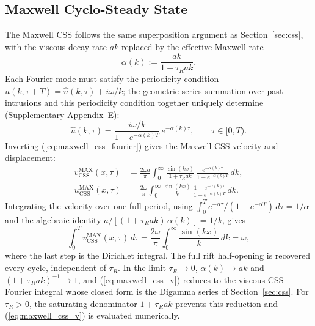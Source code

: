 \documentclass[12pt]{article}
\begin{document}
\subsection{Maxwell Cyclo-Steady State}
\label{sec:maxwell_css}

The Maxwell CSS follows the same superposition argument as
Section~\ref{sec:css}, with the viscous decay rate $ak$ replaced by the
effective Maxwell rate
\begin{equation}
  \alpha(k) := \frac{ak}{1+\tau_R ak}.
  \label{eq:alpha_k}
\end{equation}
Each Fourier mode must satisfy the periodicity condition
$\hat{u}(k,\tau+T) = \hat{u}(k,\tau) + i\omega/k$; the geometric-series
summation over past intrusions and this periodicity condition together
uniquely determine (Supplementary Appendix~E):
\begin{equation}
  \hat{u}(k,\tau) = \frac{i\omega/k}{1-e^{-\alpha(k)T}}\,e^{-\alpha(k)\tau},
  \qquad \tau\in[0,T).
  \label{eq:maxwell_css_fourier}
\end{equation}
Inverting (\ref{eq:maxwell_css_fourier}) gives the Maxwell CSS velocity
and displacement:
\begin{align}
  v_{\text{CSS}}^{\text{MAX}}(x,\tau)
  &= \frac{2\omega a}{\pi}\int_0^{\infty}
     \frac{\sin(kx)}{1+\tau_R ak}\,
     \frac{e^{-\alpha(k)\tau}}{1-e^{-\alpha(k)T}}\,dk,
  \label{eq:maxwell_css_v} \\
  u_{\text{CSS}}^{\text{MAX}}(x,\tau)
  &= \frac{2\omega}{\pi}\int_0^{\infty}
     \frac{\sin(kx)}{k}\,
     \frac{1-e^{-\alpha(k)\tau}}{1-e^{-\alpha(k)T}}\,dk.
  \label{eq:maxwell_css_u}
\end{align}
Integrating the velocity over one full period, using
$\int_0^T e^{-\alpha\tau}/(1-e^{-\alpha T})\,d\tau = 1/\alpha$ and the
algebraic identity $a/[(1+\tau_R ak)\,\alpha(k)] = 1/k$, gives
\begin{equation}
  \int_0^T v_{\text{CSS}}^{\text{MAX}}(x,\tau)\,d\tau
  = \frac{2\omega}{\pi}\int_0^{\infty}
    \frac{\sin(kx)}{k}\,dk = \omega,
\end{equation}
where the last step is the Dirichlet integral.  The full rift half-opening
is recovered every cycle, independent of $\tau_R$.  In the limit
$\tau_R\to 0$, $\alpha(k)\to ak$ and $(1+\tau_R ak)^{-1}\to 1$, and
(\ref{eq:maxwell_css_v}) reduces to the viscous CSS Fourier integral whose
closed form is the Digamma series of Section~\ref{sec:css}.  For
$\tau_R > 0$, the saturating denominator $1+\tau_R ak$ prevents this
reduction and (\ref{eq:maxwell_css_v}) is evaluated numerically.
\end{document}
